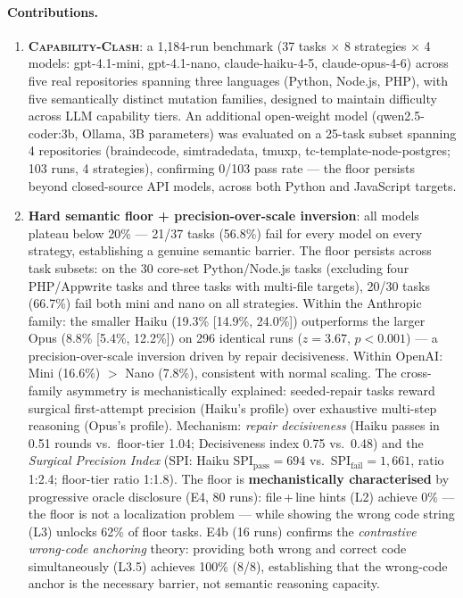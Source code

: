 \documentclass[sigconf,review,anonymous]{acmart}
\newcommand{\ccbench}{\textsc{Capability-Clash}}
\begin{document}
\paragraph{Contributions.}
\begin{enumerate}[leftmargin=*,itemsep=2pt]
  \item \textbf{\ccbench{}}: a 1{,}184-run benchmark (37 tasks $\times$ 8 strategies $\times$ 4 models: gpt-4.1-mini, gpt-4.1-nano, claude-haiku-4-5, claude-opus-4-6) across five real repositories spanning three languages (Python, Node.js, PHP), with five semantically distinct mutation families, designed to maintain difficulty across LLM capability tiers. An additional open-weight model (qwen2.5-coder:3b, Ollama, 3B parameters) was evaluated on a 25-task subset spanning 4 repositories (braindecode, simtradedata, tmuxp, tc-template-node-postgres; 103 runs, 4 strategies), confirming 0/103 pass rate — the floor persists beyond closed-source API models, across both Python and JavaScript targets.

  \item \textbf{Hard semantic floor + precision-over-scale inversion}: all models plateau below 20\% — 21/37 tasks (56.8\%) fail for every model on every strategy, establishing a genuine semantic barrier. The floor persists across task subsets: on the 30 core-set Python/Node.js tasks (excluding four PHP/Appwrite tasks and three tasks with multi-file targets), 20/30 tasks (66.7\%) fail both mini and nano on all strategies. Within the Anthropic family: the smaller Haiku (19.3\% [14.9\%, 24.0\%]) outperforms the larger Opus (8.8\% [5.4\%, 12.2\%]) on 296 identical runs ($z=3.67$, $p<0.001$) — a precision-over-scale inversion driven by repair decisiveness. Within OpenAI: Mini (16.6\%) $>$ Nano (7.8\%), consistent with normal scaling. The cross-family asymmetry is mechanistically explained: seeded-repair tasks reward surgical first-attempt precision (Haiku's profile) over exhaustive multi-step reasoning (Opus's profile). Mechanism: \emph{repair decisiveness} (Haiku passes in 0.51 rounds vs.\ floor-tier 1.04; Decisiveness index 0.75 vs.\ 0.48) and the \emph{Surgical Precision Index} (SPI: Haiku SPI$_{\text{pass}}=694$ vs.\ SPI$_{\text{fail}}=1{,}661$, ratio 1:2.4; floor-tier ratio 1:1.8). The floor is \textbf{mechanistically characterised} by progressive oracle disclosure (E4, 80 runs): file\,+\,line hints (L2) achieve 0\% — the floor is not a localization problem — while showing the wrong code string (L3) unlocks 62\% of floor tasks. E4b (16 runs) confirms the \emph{contrastive wrong-code anchoring} theory: providing both wrong and correct code simultaneously (L3.5) achieves 100\% (8/8), establishing that the wrong-code anchor is the necessary barrier, not semantic reasoning capacity.


\end{enumerate}
\end{document}
